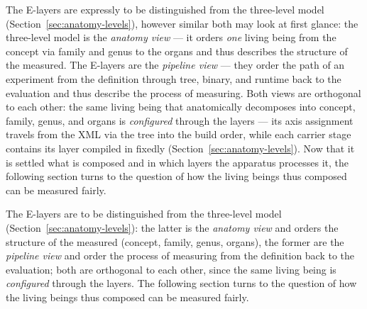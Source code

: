 \begin{nurlang}
The E-layers are expressly to be distinguished from the three-level model (Section~\ref{sec:anatomy-levels}),
however similar both may look at first glance: the three-level model is the
\emph{anatomy view} --- it orders \emph{one} living being from the concept via family and genus to the
organs and thus describes the structure of the measured. The E-layers are the \emph{pipeline view}
--- they order the path of an experiment from the definition through tree, binary, and runtime back to the
evaluation and thus describe the process of measuring. Both views are orthogonal to each other:
the same living being that anatomically decomposes into concept, family, genus, and organs is \emph{configured}
through the layers --- its axis assignment travels from the XML via the tree into the
build order, while each carrier stage contains its layer compiled in fixedly
(Section~\ref{sec:anatomy-levels}). Now that it is settled what is composed and in which
layers the apparatus processes it, the following section turns to the question of how the living beings thus
composed can be measured fairly.
\end{nurlang}
\begin{nurkurz}
The E-layers are to be distinguished from the three-level model (Section~\ref{sec:anatomy-levels}): the
latter is the \emph{anatomy view} and orders the structure of the measured (concept, family, genus, organs), the
former are the \emph{pipeline view} and order the process of measuring from the definition back to the
evaluation; both are orthogonal to each other, since the same living being is \emph{configured} through
the layers. The following section turns to the question of how the living beings thus composed can be
measured fairly.
\end{nurkurz}

